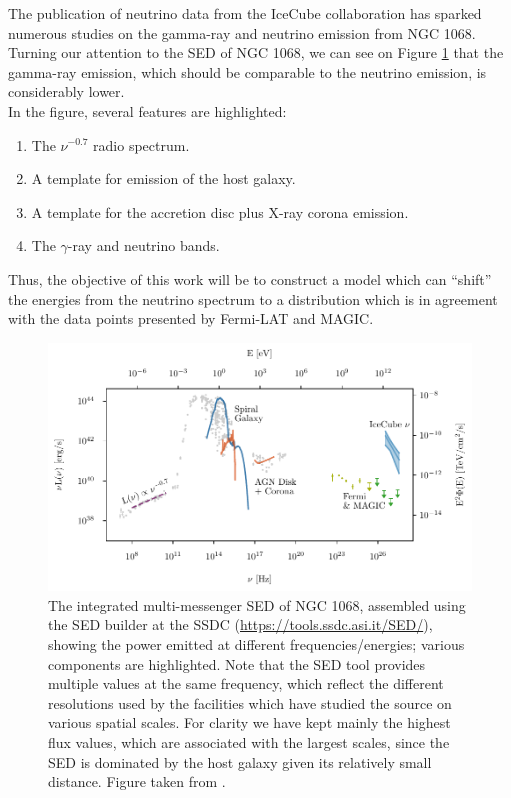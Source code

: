 The publication of neutrino data from the IceCube collaboration \citep{IceCube2022} has sparked numerous studies on the gamma-ray and neutrino emission from NGC 1068. Turning our attention to the SED of NGC 1068, we can see on Figure \ref{fig:NGC1068_SED} that the gamma-ray emission, which should be comparable to the neutrino emission, is considerably lower.\\

In the figure, several features are highlighted: 
\begin{enumerate}
    \item The $\nu^{-0.7}$ radio spectrum.
    \item A template for emission of the host galaxy.
    \item A template for the accretion disc plus X-ray corona emission.
    \item The $\gamma$-ray and neutrino bands.
\end{enumerate}

Thus, the objective of this work will be to construct a model which can ``shift'' the energies from the neutrino spectrum to a distribution which is in agreement with the data points presented by Fermi-LAT and MAGIC.

\begin{figure}[H]
    \centering
    \includegraphics[width=\textwidth]{Figures/NGC1068_SED.pdf}
    \caption{The integrated multi-messenger SED of NGC 1068, assembled using the
    SED builder at the SSDC (\url{https://tools.ssdc.asi.it/SED/}), showing the power emitted at different frequencies/energies; various components are highlighted. Note that the SED tool provides multiple values at the same frequency, which reflect the different resolutions used by the facilities which have studied the source on various spatial scales. For clarity we have kept mainly the highest flux values, which are associated with the largest scales, since the SED is dominated by the host galaxy given its relatively small distance. Figure taken from \cite{padovani2024highenergyneutrinosvicinitysupermassive}.}
    \label{fig:NGC1068_SED}
\end{figure}

